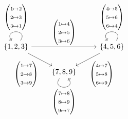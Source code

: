 \begin{computation}
\begin{minipage}{0.40\textwidth}
\[
\begin{tikzcd}
{\{1,2,3\}} \arrow["\begin{pmatrix} 1\mapsto 2 \\ 2\mapsto 3\\ 3\mapsto 1\end{pmatrix}"', loop, distance=2em, in=125, out=55] \arrow[rr, "\begin{pmatrix} 1\mapsto 4 \\ 2\mapsto 5\\ 3\mapsto 6\end{pmatrix}"] \arrow[rd, "\begin{pmatrix} 1\mapsto 7 \\ 2\mapsto 8\\ 3\mapsto 9\end{pmatrix}"'] &                                                                                                                                & {\{4,5,6\}} \arrow["\begin{pmatrix} 4\mapsto 5 \\ 5\mapsto 6\\ 6\mapsto 4\end{pmatrix}"', loop, distance=2em, in=125, out=55] \arrow[ld, "\begin{pmatrix} 4\mapsto 7 \\ 5\mapsto 8\\ 6\mapsto 9\end{pmatrix}"] \\
                                                                                                                                                                                                                                                                                                 & {\{7,8,9\}} \arrow["\begin{pmatrix} 7\mapsto 8 \\ 8\mapsto 9\\ 9\mapsto 7\end{pmatrix}"', loop, distance=2em, in=305, out=235] &                                                                                                                                                                                                               
\end{tikzcd}
\]
\end{minipage}
\begin{minipage}{0.05\textwidth}
\phantom{}
\end{minipage}

\end{computation}
